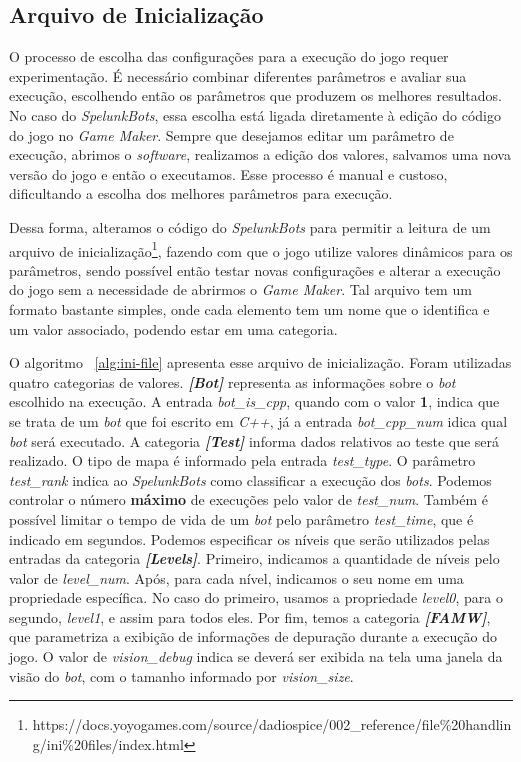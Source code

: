 \subsection{Arquivo de Inicialização}

O processo de escolha das configurações para a execução do jogo requer
experimentação. É necessário combinar diferentes parâmetros e avaliar sua
execução, escolhendo então os parâmetros que produzem os melhores resultados.
No caso do \textit{SpelunkBots}, essa escolha está ligada diretamente à edição
do código do jogo no \textit{Game Maker}. Sempre que desejamos editar um
parâmetro de execução, abrimos o \textit{software}, realizamos a edição dos
valores, salvamos uma nova versão do jogo e então o executamos. Esse processo é
manual e custoso, dificultando a escolha dos melhores parâmetros para execução.  

Dessa forma, alteramos o código do \textit{SpelunkBots} para permitir a leitura
de um arquivo de
inicialização\footnote{https://docs.yoyogames.com/source/dadiospice/002\_reference/file\%20handling/ini\%20files/index.html},
fazendo com que o jogo utilize valores dinâmicos para os parâmetros, sendo
possível então testar novas configurações e alterar a execução do jogo sem
a necessidade de abrirmos o \textit{Game Maker}. Tal arquivo tem um formato
bastante simples, onde cada elemento tem um nome que o identifica e um
valor associado, podendo estar em uma categoria.

O algoritmo ~\ref{alg:ini-file} apresenta esse arquivo de inicialização. Foram
utilizadas quatro categorias de valores. \textit{\textbf{[Bot]}} representa as
informações sobre o \textit{bot} escolhido na execução. A entrada
\textit{bot\_is\_cpp}, quando com o valor \textbf{1}, indica que se trata de um
\textit{bot} que foi escrito em \textit{C++}, já a entrada
\textit{bot\_cpp\_num} idica qual \textit{bot} será executado.  A categoria
\textit{\textbf{[Test]}} informa dados relativos ao teste que será realizado. O
tipo de mapa é informado pela entrada \textit{test\_type}. O parâmetro
\textit{test\_rank} indica ao \textit{SpelunkBots} como classificar a execução
dos \textit{bots}. Podemos controlar o número \textbf{máximo} de execuções pelo
valor de \textit{test\_num}. Também é possível limitar o tempo de vida de um
\textit{bot} pelo parâmetro \textit{test\_time}, que é indicado em segundos.
Podemos especificar os níveis que serão utilizados pelas entradas da categoria
\textit{\textbf{[Levels]}}. Primeiro, indicamos a quantidade de níveis pelo
valor de \textit{level\_num}. Após, para cada nível, indicamos o seu nome em
uma propriedade específica. No caso do primeiro, usamos a propriedade
\textit{level0}, para o segundo, \textit{level1}, e assim para todos eles.  Por
fim, temos a categoria \textit{\textbf{[FAMW]}}, que parametriza a exibição de
informações de depuração durante a execução do jogo.  O valor de
\textit{vision\_debug} indica se deverá ser exibida na tela uma janela da visão
do \textit{bot}, com o tamanho informado por \textit{vision\_size}.

